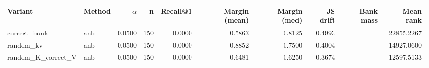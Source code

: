 \begin{tabular}{l l r r r r r r r r}
\toprule
Variant & Method & $\alpha$ & n & Recall@1 & Margin (mean) & Margin (med) & JS drift & Bank mass & Mean rank \\
\midrule
correct\_bank & anb & 0.0500 & 150 & 0.0000 & -0.5863 & -0.8125 & 0.4993 &  & 22855.2267 \\
random\_kv & anb & 0.0500 & 150 & 0.0000 & -0.8852 & -0.7500 & 0.4004 &  & 14927.0600 \\
random\_K\_correct\_V & anb & 0.0500 & 150 & 0.0000 & -0.6481 & -0.6250 & 0.3674 &  & 12597.5133 \\
\bottomrule
\end{tabular}
